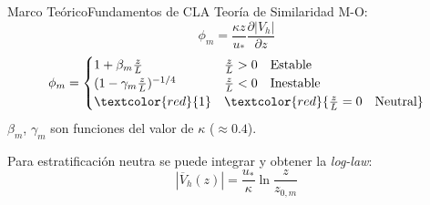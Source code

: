 \documentclass[mathserif,10pt]{beamer}
\newcommand{\be}{\begin{equation}}
\newcommand{\ee}{\end{equation}}
\begin{document}
\begin{frame}{Marco Teórico}{Fundamentos de CLA}
	Teoría de Similaridad M-O:
	\be \label{eq:03_simi_u}
	{\phi_m} = \frac{\kappa z}{u_*}\frac{\partial |V_h|}{\partial z}
	\ee
	\be 
	\phi_m = \begin{cases}
		1+\beta_m \frac{z}{L} & \frac{z}{L}>0  \quad\text{Estable}\\
		(1-\gamma_m \frac{z}{L})^{-1/4} & \frac{z}{L}<0 \quad \text{Inestable}\\
		\textcolor{red}{1} & \textcolor{red}{\frac{z}{L}=0  \quad \text{Neutral}}
	\end{cases}
	\ee 
	$\beta_m$, $\gamma_m$ son funciones del valor de $\kappa$ ($\approx0.4$).
	
	Para estratificación neutra se puede integrar y obtener la \emph{log-law}:
	\be |\overline{V}_h(z)| = \frac{u_*}{\kappa}\ln\frac{z}{z_{0,m}} \ee
	
\end{frame}


\end{document}
